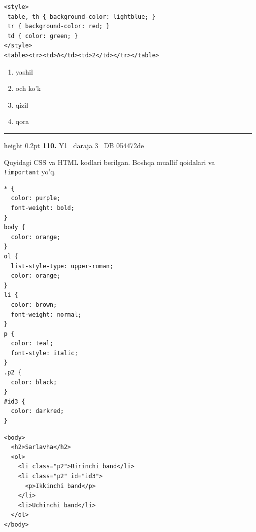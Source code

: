 \documentclass[10pt,a4paper,oneside]{article}
\begin{document}
\par
\begin{lstlisting}
<style>
 table, th { background-color: lightblue; }
 tr { background-color: red; }
 td { color: green; }
</style>
<table><tr><td>A</td><td>2</td></tr></table>
\end{lstlisting}

\begin{enumerate}[label=\Alph*),leftmargin=9mm]
\item yashil
\item och ko'k
\item qizil
\item qora
\end{enumerate}
\vspace{2mm}\hrule height 0.2pt \vspace{4mm}
\hypertarget{q110}{\textbf{\color{ink}110.}}  {\color{muted}\scriptsize Y1 \textbullet\ daraja 3 \textbullet\ DB 054472de}
\par
Quyidagi CSS va HTML kodlari berilgan. Boshqa muallif qoidalari va \texttt{!important} yo'q.

\par
\begin{lstlisting}
* {
  color: purple;
  font-weight: bold;
}
body {
  color: orange;
}
ol {
  list-style-type: upper-roman;
  color: orange;
}
li {
  color: brown;
  font-weight: normal;
}
p {
  color: teal;
  font-style: italic;
}
.p2 {
  color: black;
}
#id3 {
  color: darkred;
}
\end{lstlisting}


\par
\begin{lstlisting}
<body>
  <h2>Sarlavha</h2>
  <ol>
    <li class="p2">Birinchi band</li>
    <li class="p2" id="id3">
      <p>Ikkinchi band</p>
    </li>
    <li>Uchinchi band</li>
  </ol>
</body>
\end{lstlisting}
\end{document}
